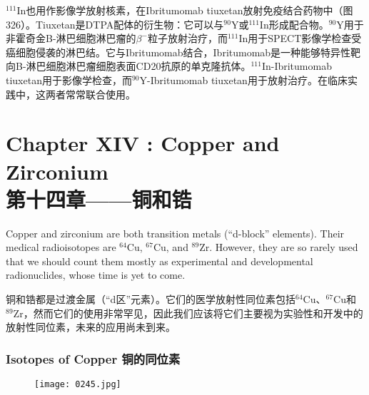\documentclass[dvipsnames, svgnames,a4paper,11pt]{article}
\begin{document}
\(\mathrm{^{111}In}\)也用作影像学放射核素，在Ibritumomab tiuxetan放射免疫结合药物中（图326）。Tiuxetan是DTPA配体的衍生物：它可以与\(\mathrm{^{90}Y}\)或\(\mathrm{^{111}In}\)形成配合物。\(\mathrm{^{90}Y}\)用于非霍奇金B-淋巴细胞淋巴瘤的\(\beta^-\)粒子放射治疗，而\(\mathrm{^{111}In}\)用于SPECT影像学检查受癌细胞侵袭的淋巴结。它与Ibritumomab结合，Ibritumomab是一种能够特异性靶向B-淋巴细胞淋巴瘤细胞表面CD20抗原的单克隆抗体。\(\mathrm{^{111}In}\)-Ibritumomab tiuxetan用于影像学检查，而\(\mathrm{^{90}Y}\)-Ibritumomab tiuxetan用于放射治疗。在临床实践中，这两者常常联合使用。

\newpage

\section{Chapter XIV :  Copper and Zirconium \\第十四章——铜和锆}

Copper and zirconium are both transition metals (“d-block” elements). Their medical radioisotopes are \(\mathrm{^{64}Cu}\), \(\mathrm{^{67}Cu}\), and \(\mathrm{^{89}Zr}\). However, they are so rarely used that we should count them mostly as experimental and developmental radionuclides, whose time is yet to come.

铜和锆都是过渡金属（“d区”元素）。它们的医学放射性同位素包括\(\mathrm{^{64}Cu}\)、\(\mathrm{^{67}Cu}\)和\(\mathrm{^{89}Zr}\)，然而它们的使用非常罕见，因此我们应该将它们主要视为实验性和开发中的放射性同位素，未来的应用尚未到来。

\subsubsection{Isotopes of Copper 铜的同位素}  

\begin{figure}[h]
	\centering
    \texttt{[image: 0245.jpg]}  
     \label{fig327}
\end{figure}
\end{document}

